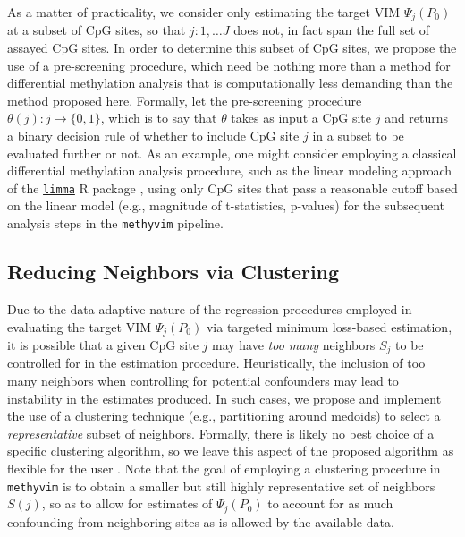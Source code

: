 \documentclass[9pt,a4paper,]{extarticle}
\theoremstyle{definition}
\theoremstyle{definition}
\theoremstyle{definition}
\theoremstyle{remark}
\begin{document}
As a matter of practicality, we consider only estimating the target VIM
\(\Psi_j(P_0)\) at a subset of CpG sites, so that \(j: 1, \ldots J\) does not, in
fact span the full set of assayed CpG sites. In order to determine this subset
of CpG sites, we propose the use of a pre-screening procedure, which need be
nothing more than a method for differential methylation analysis that is
computationally less demanding than the method proposed here. Formally, let the
pre-screening procedure \(\theta(j): j \to \{0, 1\}\), which is to say that
\(\theta\) takes as input a CpG site \(j\) and returns a binary decision rule of
whether to include CpG site \(j\) in a subset to be evaluated further or not. As
an example, one might consider employing a classical differential methylation
analysis procedure, such as the linear modeling approach of the
\href{https://bioconductor.org/packages/limma}{\texttt{limma}} R package
\citep[\citet{robinson2014statistical}]{smyth2004linear}, using only CpG sites that pass a
reasonable cutoff based on the linear model (e.g., magnitude of t-statistics,
p-values) for the subsequent analysis steps in the \texttt{methyvim} pipeline.

\hypertarget{reducing-neighbors-via-clustering}{%
\subsection{Reducing Neighbors via Clustering}\label{reducing-neighbors-via-clustering}}

Due to the data-adaptive nature of the regression procedures employed in
evaluating the target VIM \(\Psi_j(P_0)\) via targeted minimum loss-based
estimation, it is possible that a given CpG site \(j\) may have \emph{too many}
neighbors \(S_j\) to be controlled for in the estimation procedure. Heuristically,
the inclusion of too many neighbors when controlling for potential confounders
may lead to instability in the estimates produced. In such cases, we propose and
implement the use of a clustering technique (e.g., partitioning around medoids)
to select a \emph{representative} subset of neighbors. Formally, there is likely no
best choice of a specific clustering algorithm, so we leave this aspect of the
proposed algorithm as flexible for the user \citep{kleinberg2003impossibility}. Note
that the goal of employing a clustering procedure in \texttt{methyvim} is to obtain a
smaller but still highly representative set of neighbors \(S(j)\), so as to allow
for estimates of \(\Psi_j(P_0)\) to account for as much confounding from
neighboring sites as is allowed by the available data.
\end{document}
